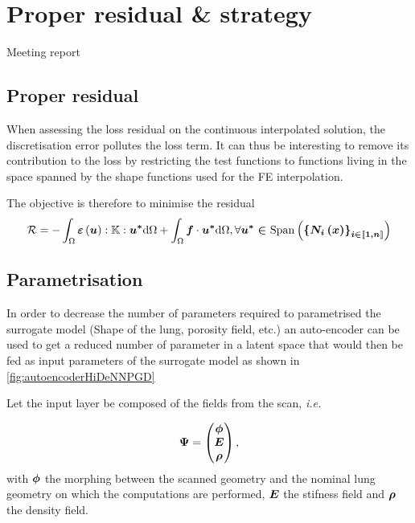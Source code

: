  \chapter[The 23$^{\text{d}}$ of May 2024 - Proper residual \& strategy]{Proper residual \& strategy}

\begin{chapabstract}
	Meeting report
\end{chapabstract}


\minitoc

\section{Proper residual}

When assessing the loss residual on the continuous interpolated solution, the discretisation error pollutes the loss term. It can thus be interesting to remove its contribution to the loss by restricting the test functions to functions living in the space spanned by the shape functions used for the FE interpolation.

The objective is therefore to minimise the residual
\begin{equation}
	\mathcal{R} = - \int_{\Omega} \mathcal{\boldsymbol{\varepsilon}}\left(\boldsymbol{u}\right):\mathbb{K}:\boldsymbol{u^*} \mathrm{d} \Omega + \int_{\Omega} \boldsymbol{f}\cdot \boldsymbol{u^*}\mathrm{d} \Omega, \forall \boldsymbol{u^* \in \text{Span}\left(\left\{N_i\left(\boldsymbol{x}\right)\right\}_{i\in \llbracket 1,n \rrbracket}\right)}
\end{equation}

\section{Parametrisation}

In order to decrease the number of parameters required to parametrised the surrogate model (Shape of the lung, porosity field, etc.) an auto-encoder can be used to get a reduced number of parameter in a latent space that would then be fed as input parameters of the surrogate model as shown in \cref{fig:autoencoderHiDeNNPGD}

Let the input layer be composed of the fields from the scan, \emph{i.e.}

\begin{equation}
	\boldsymbol{\Psi} = \begin{pmatrix}
		\boldsymbol{\phi} \\  
		\boldsymbol{E}\\  
		\boldsymbol{\rho}    
	\end{pmatrix}, 
\end{equation}
with $\boldsymbol{\phi} $ the morphing between the scanned geometry and the nominal lung geometry on which the computations are performed, $\boldsymbol{E}$ the stifness field and $\boldsymbol{\rho}$ the density field. 



